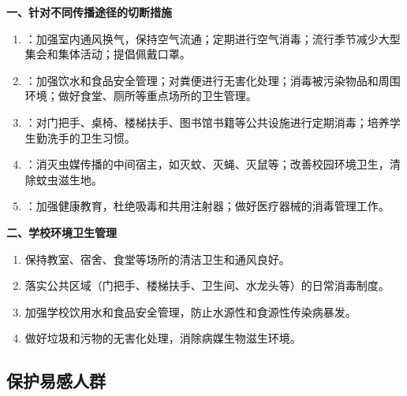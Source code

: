 \begin{keybox}
\textbf{一、针对不同传播途径的切断措施}
\begin{enumerate}[leftmargin=*]
    \item {}：加强室内通风换气，保持空气流通；定期进行空气消毒；流行季节减少大型集会和集体活动；提倡佩戴口罩。
    \item {}：加强饮水和食品安全管理；对粪便进行无害化处理；消毒被污染物品和周围环境；做好食堂、厕所等重点场所的卫生管理。
    \item {}：对门把手、桌椅、楼梯扶手、图书馆书籍等公共设施进行定期消毒；培养学生勤洗手的卫生习惯。
    \item {}：消灭虫媒传播的中间宿主，如灭蚊、灭蝇、灭鼠等；改善校园环境卫生，清除蚊虫滋生地。
    \item {}：加强健康教育，杜绝吸毒和共用注射器；做好医疗器械的消毒管理工作。
\end{enumerate}

\textbf{二、学校环境卫生管理}
\begin{enumerate}[leftmargin=*]
    \item 保持教室、宿舍、食堂等场所的清洁卫生和通风良好。
    \item 落实公共区域（门把手、楼梯扶手、卫生间、水龙头等）的日常消毒制度。
    \item 加强学校饮用水和食品安全管理，防止水源性和食源性传染病暴发。
    \item 做好垃圾和污物的无害化处理，消除病媒生物滋生环境。
\end{enumerate}
\end{keybox}

\subsection{保护易感人群}

